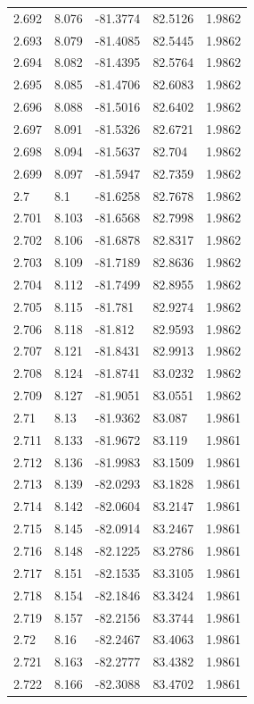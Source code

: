 \begin{tabular}{lllll}
2.692 & 8.076 & -81.3774 & 82.5126 & 1.9862 \\
2.693 & 8.079 & -81.4085 & 82.5445 & 1.9862 \\
2.694 & 8.082 & -81.4395 & 82.5764 & 1.9862 \\
2.695 & 8.085 & -81.4706 & 82.6083 & 1.9862 \\
2.696 & 8.088 & -81.5016 & 82.6402 & 1.9862 \\
2.697 & 8.091 & -81.5326 & 82.6721 & 1.9862 \\
2.698 & 8.094 & -81.5637 & 82.704 & 1.9862 \\
2.699 & 8.097 & -81.5947 & 82.7359 & 1.9862 \\
2.7 & 8.1 & -81.6258 & 82.7678 & 1.9862 \\
2.701 & 8.103 & -81.6568 & 82.7998 & 1.9862 \\
2.702 & 8.106 & -81.6878 & 82.8317 & 1.9862 \\
2.703 & 8.109 & -81.7189 & 82.8636 & 1.9862 \\
2.704 & 8.112 & -81.7499 & 82.8955 & 1.9862 \\
2.705 & 8.115 & -81.781 & 82.9274 & 1.9862 \\
2.706 & 8.118 & -81.812 & 82.9593 & 1.9862 \\
2.707 & 8.121 & -81.8431 & 82.9913 & 1.9862 \\
2.708 & 8.124 & -81.8741 & 83.0232 & 1.9862 \\
2.709 & 8.127 & -81.9051 & 83.0551 & 1.9862 \\
2.71 & 8.13 & -81.9362 & 83.087 & 1.9861 \\
2.711 & 8.133 & -81.9672 & 83.119 & 1.9861 \\
2.712 & 8.136 & -81.9983 & 83.1509 & 1.9861 \\
2.713 & 8.139 & -82.0293 & 83.1828 & 1.9861 \\
2.714 & 8.142 & -82.0604 & 83.2147 & 1.9861 \\
2.715 & 8.145 & -82.0914 & 83.2467 & 1.9861 \\
2.716 & 8.148 & -82.1225 & 83.2786 & 1.9861 \\
2.717 & 8.151 & -82.1535 & 83.3105 & 1.9861 \\
2.718 & 8.154 & -82.1846 & 83.3424 & 1.9861 \\
2.719 & 8.157 & -82.2156 & 83.3744 & 1.9861 \\
2.72 & 8.16 & -82.2467 & 83.4063 & 1.9861 \\
2.721 & 8.163 & -82.2777 & 83.4382 & 1.9861 \\
2.722 & 8.166 & -82.3088 & 83.4702 & 1.9861 \\

\end{tabular}

